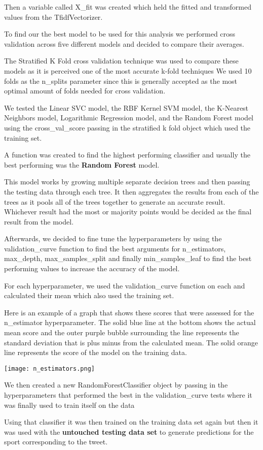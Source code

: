 \documentclass{article}
\begin{document}
\begin{enumerate}
    Then a variable called X\_fit was created which held the fitted and transformed values from the TfidfVectorizer.

    To find our the best model to be used for this analysis we performed cross validation across five different models and decided to compare their averages. 


    The Stratified K Fold cross validation technique was used to compare these models as it is perceived one of the most accurate k-fold techniques We used 10 folds as the n\_splits parameter since this is generally accepted as the most optimal amount of folds needed for cross validation.

    We tested the Linear SVC model, the RBF Kernel SVM model, the K-Nearest Neighbors model, Logarithmic Regression model, and the Random Forest model using the cross\_val\_score passing in the stratified k fold object which used the training set.

    A function was created to find the highest performing classifier and usually the best performing was the \textbf{Random Forest} model. 

    This model works by growing multiple separate decision trees and then passing the testing data through each tree. It then aggregates the results from each of the trees as it pools all of the trees together to generate an accurate result. Whichever result had the most or majority points would be decided as the final result from the model.

    Afterwards, we decided to fine tune the hyperparameters by using the validation\_curve function to find the best arguments for n\_estimators, max\_depth, max\_samples\_split and finally min\_samples\_leaf to find the best performing values to increase the accuracy of the model.

    For each hyperparameter, we used the validation\_curve function on each and calculated their mean which also used the training set.

    Here is an example of a graph that shows these scores that were assessed for the n\_estimator hyperparameter. The solid blue line at the bottom shows the actual mean score and the outer purple bubble surrounding the line represents the standard deviation that is plus minus from the calculated mean. The solid orange line represents the score of the model on the training data. 

    \texttt{[image: n\_estimators.png]}

    We then created a new RandomForestClassifier object by passing in the hyperparameters that performed the best in the validation\_curve tests where it was finally used to train itself on the data

    Using that classifier it was then trained on the training data set again but then it was used with the \textbf{untouched testing data set} to generate predictions for the sport corresponding to the tweet.
    
\end{enumerate}
\end{document}
